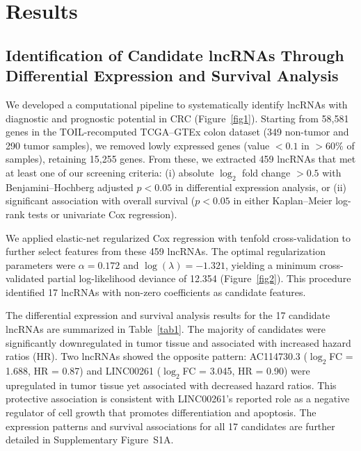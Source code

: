 \documentclass[12pt,a4paper]{article}
\begin{document}
\section{Results}

\subsection{Identification of Candidate lncRNAs Through Differential Expression and Survival Analysis}

We developed a computational pipeline to systematically identify lncRNAs with diagnostic and prognostic potential in CRC (Figure~\ref{fig1}). Starting from 58,581 genes in the TOIL-recomputed TCGA--GTEx colon dataset (349 non-tumor and 290 tumor samples), we removed lowly expressed genes (value $< 0.1$ in $> 60\%$ of samples), retaining 15,255 genes. From these, we extracted 459 lncRNAs that met at least one of our screening criteria: (i) absolute $\log_2$ fold change $> 0.5$ with Benjamini--Hochberg adjusted $p < 0.05$ in differential expression analysis, or (ii) significant association with overall survival ($p < 0.05$ in either Kaplan--Meier log-rank tests or univariate Cox regression).

We applied elastic-net regularized Cox regression with tenfold cross-validation to further select features from these 459 lncRNAs. The optimal regularization parameters were $\alpha = 0.172$ and $\log(\lambda) = -1.321$, yielding a minimum cross-validated partial log-likelihood deviance of 12.354 (Figure~\ref{fig2}). This procedure identified 17 lncRNAs with non-zero coefficients as candidate features.

The differential expression and survival analysis results for the 17 candidate lncRNAs are summarized in Table~\ref{tab1}. The majority of candidates were significantly downregulated in tumor tissue and associated with increased hazard ratios (HR). Two lncRNAs showed the opposite pattern: AC114730.3 ($\log_2$FC = 1.688, HR = 0.87) and LINC00261 ($\log_2$FC = 3.045, HR = 0.90) were upregulated in tumor tissue yet associated with decreased hazard ratios. This protective association is consistent with LINC00261's reported role as a negative regulator of cell growth that promotes differentiation and apoptosis. The expression patterns and survival associations for all 17 candidates are further detailed in Supplementary Figure~S1A.
\end{document}
